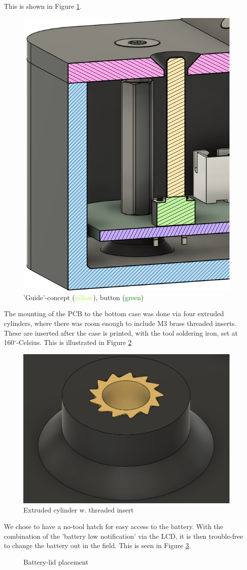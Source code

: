 This is shown in Figure \ref{fig:guide}.
\begin{figure}[h]
    \centering
    \includegraphics[width=0.35\linewidth]{images/guide.png}
    \caption{'Guide'-concept (\textcolor{GreenYellow}{yellow}), button (\textcolor{green}{green})}
    \label{fig:guide}
\end{figure}
\newpage
The mounting of the PCB to the bottom case was done via four extruded cylinders, where there was room enough to include M3 brass threaded inserts. These are inserted after the case is printed, with the tool soldering iron, set at 160$^\circ$-Celsius. This is illustrated in Figure \ref{fig:thread1}
\begin{figure}[h]
    \centering
    \includegraphics[width=0.5\linewidth]{images/threadinsert.png}
    \caption{Extruded cylinder w. threaded insert}
    \label{fig:thread1}
\end{figure}

We chose to have a no-tool hatch for easy access to the battery. With the combination of the 'battery low notification' via the LCD, it is then trouble-free to change the battery out in the field. This is seen in Figure \ref{fig:lid}.
\begin{figure}[h]
  \centering
  \hfill
  \caption{Battery-lid placement}
  \label{fig:lid}
\end{figure}

